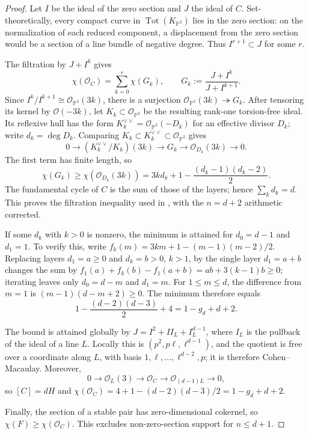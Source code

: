 \documentclass[11pt,reqno]{amsart}
\theoremstyle{definition}
\newcommand{\Pp}{\mathbb P}
\newcommand{\Ocal}{\mathcal O}
\newcommand{\Tot}{\operatorname{Tot}}
\begin{document}
\begin{proof}
Let $I$ be the ideal of the zero section and $J$ the ideal of $C$.
Set-theoretically, every compact curve in $\Tot(K_{\Pp^2})$ lies in the
zero section: on the normalization of each reduced component, a displacement
from the zero section would be a section of a line bundle of negative degree.
Thus $I^{r+1}\subset J$ for some $r$.

The filtration by $J+I^k$ gives
\[
 \chi(\Ocal_C)=\sum_{k=0}^r\chi(G_k),\qquad
 G_k:=\frac{J+I^k}{J+I^{k+1}}.
\]
Since $I^k/I^{k+1}\cong\Ocal_{\Pp^2}(3k)$, there is a surjection
$\Ocal_{\Pp^2}(3k)\twoheadrightarrow G_k$.
After tensoring its kernel by
$\Ocal(-3k)$, let $K_k\subset\Ocal_{\Pp^2}$ be the resulting rank-one
torsion-free ideal.  Its reflexive hull has the form
$K_k^{\vee\vee}=\Ocal_{\Pp^2}(-D_k)$ for an effective divisor $D_k$; write
$d_k=\deg D_k$.  Comparing
$K_k\subset K_k^{\vee\vee}\subset\Ocal_{\Pp^2}$ gives
\[
 0\longrightarrow (K_k^{\vee\vee}/K_k)(3k)
 \longrightarrow G_k\longrightarrow\Ocal_{D_k}(3k)\longrightarrow0.
\]
The first term has finite length, so
\[
 \chi(G_k)\ge\chi(\Ocal_{D_k}(3k))
 =3kd_k+1-\frac{(d_k-1)(d_k-2)}2.
\]
The fundamental cycle of $C$ is the sum of those of the layers; hence
$\sum_kd_k=d$.  This proves the filtration inequality used in
\cite[proof of Proposition~2]{CKK}, with the $n=d+2$ arithmetic corrected.

If some $d_k$ with $k>0$ is nonzero, the minimum is attained for
$d_0=d-1$ and $d_1=1$.  To verify this, write
$f_k(m)=3km+1-(m-1)(m-2)/2$.  Replacing layers
$d_1=a\ge0$ and $d_k=b>0$, $k>1$, by the single layer $d_1=a+b$ changes the
sum by
$f_1(a)+f_k(b)-f_1(a+b)=ab+3(k-1)b\ge0$; iterating leaves only
$d_0=d-m$ and $d_1=m$.  For $1\le m\le d$, the difference from $m=1$
is $(m-1)(d-m+2)\ge0$.  The minimum therefore equals
\[
 1-\frac{(d-2)(d-3)}2+4=1-g_d+d+2.
\]

The bound is attained globally by
$J=I^2+I I_L+I_L^{d-1}$, where $I_L$ is the pullback of the ideal of a
line $L$.  Locally this is $(p^2,p\ell,\ell^{d-1})$, and the quotient is
free over a coordinate along $L$, with basis
$1,\ell,\ldots,\ell^{d-2},p$; it is therefore Cohen--Macaulay.  Moreover,
\[
 0\longrightarrow\Ocal_L(3)\longrightarrow\Ocal_C
 \longrightarrow\Ocal_{(d-1)L}\longrightarrow0,
\]
so $[C]=dH$ and
$\chi(\Ocal_C)=4+1-(d-2)(d-3)/2=1-g_d+d+2$.

Finally, the section of a stable pair has zero-dimensional cokernel, so
$\chi(F)\ge\chi(\Ocal_C)$.  This excludes non-zero-section support for
$n\le d+1$.
\end{proof}
\end{document}
